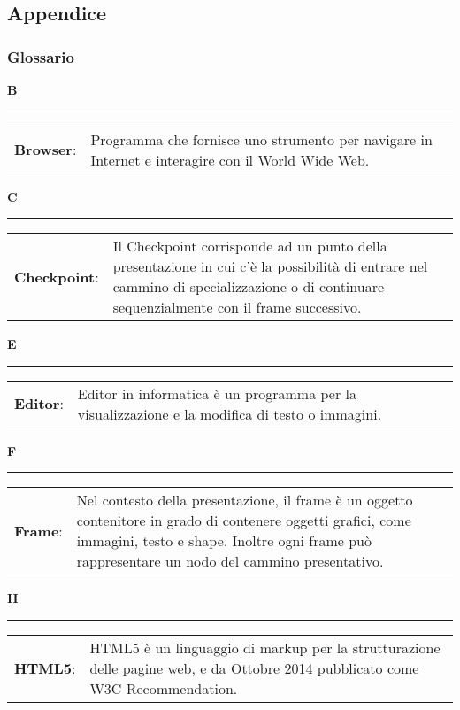 \subsection{Appendice}

\subsubsection{Glossario}
\hfill\Huge{\textbf{B}}\\
\rule{16cm}{.6pt}
\normalsize
	\begin{longtable}{p{} p{}} 
	    \\
		    \textbf{Browser}: &	Programma che fornisce uno strumento per navigare in Internet e interagire con il World Wide Web.\\
	\end{longtable}
	
\hfill\Huge{\textbf{C}}\\
\rule{16cm}{.6pt}
\normalsize
	\begin{longtable}{p{} p{}} 
	    \\
		    \textbf{Checkpoint}: &	Il Checkpoint corrisponde ad un punto della presentazione in cui c'è la possibilità di entrare nel cammino di specializzazione o di continuare sequenzialmente con il frame successivo.\\
	\end{longtable}
	
	\hfill\Huge{\textbf{E}}\\
\rule{16cm}{.6pt}
\normalsize
	\begin{longtable}{p{} p{}} 
	    \\
		    \textbf{Editor}: & Editor in informatica è un programma per la visualizzazione e la modifica di testo o immagini.\\
	\end{longtable}
	
	\hfill\Huge{\textbf{F}}\\
\rule{16cm}{.6pt}
\normalsize
	\begin{longtable}{p{} p{}} 
	    \\
		    \textbf{Frame}: & Nel contesto della presentazione, il frame è un oggetto contenitore in grado di contenere oggetti grafici, come immagini, testo e shape. Inoltre ogni frame può rappresentare un nodo del cammino presentativo.
	\end{longtable}
	
	\hfill\Huge{\textbf{H}}\\
\rule{16cm}{.6pt}
\normalsize
	\begin{longtable}{p{} p{}} 
	    \\
		    \textbf{HTML5}: & HTML5 è un linguaggio di markup per la strutturazione delle pagine web, e da Ottobre 2014 pubblicato come W3C Recommendation.
	\end{longtable}
	
